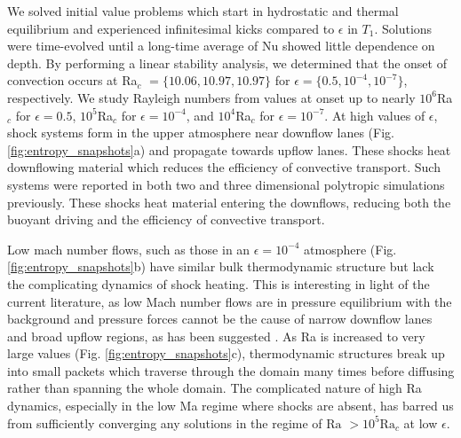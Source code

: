 \documentclass[aps, prl, twocolumn, nofootinbib, groupedaddress, amsfonts, amssymb, amsmath]{revtex4-1}
\begin{document}
We solved initial value problems which start in hydrostatic and thermal equilibrium and experienced infinitesimal 
kicks compared to $\epsilon$ in $T_1$.  Solutions were time-evolved until a long-time average of Nu showed little
dependence on depth. By performing a linear stability analysis, we determined that the onset of convection
occurs at Ra$_c$ $= \{10.06, 10.97, 10.97\}$ for $\epsilon = \{0.5, 10^{-4}, 10^{-7}\}$, respectively.  We study Rayleigh
numbers from values at onset up to nearly $10^6$Ra$_c$ for $\epsilon = 0.5$, $10^5$Ra$_c$ for $\epsilon = 10^{-4}$,
and $10^4$Ra$_c$ for $\epsilon = 10^{-7}$.  At
high values of $\epsilon$, shock systems form in the upper atmosphere near downflow lanes 
(Fig. \ref{fig:entropy_snapshots}a) and propagate towards upflow lanes.  
These shocks heat downflowing material which reduces the efficiency of convective transport.
Such systems were reported in
both two \cite{cattaneo&all1990} and three \cite{malagoli&all1990} dimensional polytropic simulations previously.
These shocks heat material entering the downflows, reducing both the
buoyant driving and the efficiency of convective transport.

Low mach number flows, such as those in an $\epsilon = 10^{-4}$ atmosphere (Fig. \ref{fig:entropy_snapshots}b)
have similar bulk thermodynamic structure but lack the complicating dynamics of shock heating. This is interesting
in light of the current literature, as low Mach number flows are in pressure equilibrium with the background and
pressure forces cannot be the cause of narrow downflow lanes and broad upflow regions, as has been suggested
\cite{hurlburt&all1984}.  As Ra is
increased to very large values (Fig. \ref{fig:entropy_snapshots}c), thermodynamic structures 
break up into small packets which traverse through the domain many
times before diffusing rather than spanning the whole domain.  
The complicated nature of high Ra dynamics, especially in the low Ma regime where
shocks are absent, has barred us from sufficiently converging any solutions in the regime of 
$\text{Ra }> 10^5\text{Ra}_c$ at low $\epsilon$.
\end{document}
